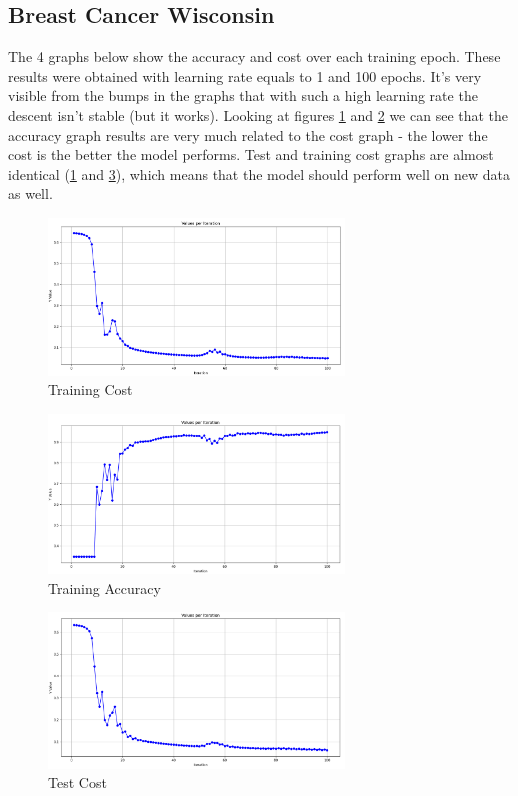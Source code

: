 \documentclass{article}
\begin{document}
        \subsection*{Breast Cancer Wisconsin}
            The 4 graphs below show the accuracy and cost over each training epoch. These results were obtained with learning rate equals to 1 and 100 epochs. It's very visible from the bumps in the graphs that with such a high learning rate the descent isn't stable (but it works). Looking at figures \ref{fig:cancer-train-cost} and \ref{fig:cancer-train-acc} we can see that the accuracy graph results are very much related to the cost graph - the lower the cost is the better the model performs. Test and training cost graphs are almost identical (\ref{fig:cancer-train-cost} and \ref{fig:cancer-test-cost}), which means that the model should perform well on new data as well.
            \begin{figure}[H]
                \centering
                \includegraphics[width=0.7\textwidth]{cancer-train-cost.png}
                \caption{Training Cost}
                \label{fig:cancer-train-cost}
            \end{figure}
            \begin{figure}[H]
                \centering
                \includegraphics[width=0.7\textwidth]{cancer-train-acc.png}
                \caption{Training Accuracy}
                \label{fig:cancer-train-acc}
            \end{figure}
            \begin{figure}[H]
                \centering
                \includegraphics[width=0.7\textwidth]{cancer-test-cost.png}
                \caption{Test Cost}
                \label{fig:cancer-test-cost}
            \end{figure}
\end{document}

